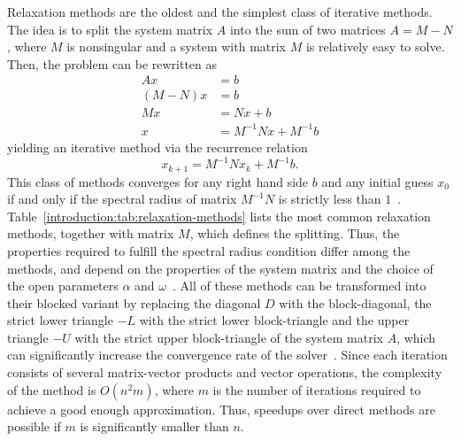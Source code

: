 Relaxation methods are the oldest and the simplest class of iterative methods.
The idea is to split the system matrix $A$ into the sum of two matrices $A = M -
N$, where $M$ is nonsingular and a system with matrix $M$ is relatively easy to
solve. Then, the problem can be rewritten as
\begin{align}
Ax &= b\\
(M - N)x &= b\\
Mx &= Nx + b \\
x &= M^{-1}Nx + M^{-1}b
\end{align}
yielding an iterative method via the recurrence relation
\begin{equation}
    x_{k+1} = M^{-1}Nx_k + M^{-1}b. \label{introduction:eqn:relaxation}
\end{equation}
This class of methods converges for any right hand side $b$ and any initial
guess $x_0$  if and only if the spectral radius of matrix $M^{-1}N$ is strictly
less than $1$~\cite{demmel,saad}.
Table~\ref{introduction:tab:relaxation-methods} lists the most common
relaxation methods, together with matrix $M$, which defines the splitting.
Thus, the properties required to fulfill the spectral radius condition
differ among the methods, and depend on the properties of the system matrix
and the choice of the open parameters $\alpha$ and
$\omega$~\cite{barrettemplates}. All of these methods can be transformed into
their blocked variant by replacing the diagonal $D$ with the block-diagonal, the
strict lower triangle $-L$ with the strict lower block-triangle and the upper
triangle $-U$ with the strict upper block-triangle of the system matrix $A$,
which can significantly increase the convergence rate of the solver~\cite{saad}.
Since each iteration consists of several matrix-vector products and vector
operations, the complexity of the method is $O(n^2 m)$, where $m$ is the number
of iterations required to achieve a good enough approximation. Thus, speedups
over direct methods are possible if $m$ is significantly smaller than $n$.

